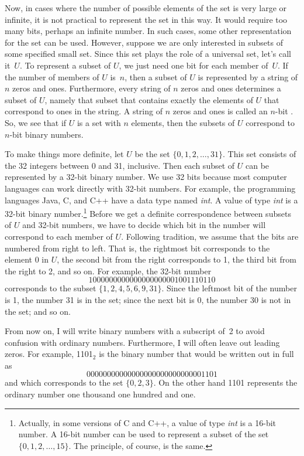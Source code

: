 Now, in cases where the number of possible elements of the set
is very large or infinite, it is not practical to represent the
set in this way.  It would require too many bits, perhaps an infinite
number.  In such cases, some other representation for the set
can be used.  However, suppose we are only interested in subsets
of some specified small set.  Since this set plays the role of
a universal set, let's call it~$U$.  To represent a subset of
$U$, we just need one bit for each member of~$U$.  If the number of members
of $U$ is~$n$, then a subset of $U$ is represented by a string
of $n$ zeros and ones.  Furthermore, every string of $n$ zeros
and ones determines a subset of $U$, namely that subset
that contains exactly the elements of $U$ that correspond to
ones in the string.  A string of $n$ zeros and ones is
called an $n$-bit .  So, we see that if
$U$ is a set with $n$ elements, then the subsets of $U$ correspond
to $n$-bit binary numbers.

To make things more definite, let $U$ be the set $\{0,1,2,\dots,31\}$.
This set consists of the 32 integers between 0 and 31, inclusive.
Then each subset of $U$ can be represented by a 32-bit binary
number.  We use 32 bits because most computer languages can work
directly with 32-bit numbers.  For example, the programming
languages Java, C, and C++ have a data type named \textit{int}.
A value of type \textit{int} is a 32-bit binary number.\footnote{Actually, in 
some versions of C and C++, a value of type \textit{int} is a 16-bit
number.  A 16-bit number can be used to represent a subset of
the set $\{0,1,2,\dots,15\}$.  The principle, of course, is the same.}
Before we get a definite correspondence between subsets of
$U$ and 32-bit numbers, we have to decide which bit in the number
will correspond to each member of $U$.  Following tradition,
we assume that the bits are numbered from right to left.  That
is, the rightmost bit corresponds to the element 0 in $U$,
the second bit from the right corresponds to 1, the third bit
from the right to 2, and so on.  For example, the 32-bit number
\[1000000000000000000001001110110\]
corresponds to the subset $\{1,2,4,5,6,9,31\}$. Since the leftmost
bit of the number is 1, the number 31 is in the set; since the
next bit is 0, the number 30 is not in the set; and so on.

From now on,
I will write binary numbers with a subscript of~2 to avoid confusion
with ordinary numbers.  Furthermore, I will often leave out leading
zeros.  For example, 1101$_2$ is the binary number that would
be written out in full as
\[00000000000000000000000000001101\]
and which corresponds to the set $\{0,2,3\}$.  On the other hand
1101 represents the ordinary number one thousand one hundred and one.


